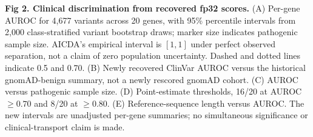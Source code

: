 \caption{{\bf Fig 2. Clinical discrimination from recovered fp32 scores.} (A) Per-gene AUROC for 4,677 variants across 20 genes, with 95\% percentile intervals from 2,000 class-stratified variant bootstrap draws; marker size indicates pathogenic sample size. AICDA's empirical interval is $[1,1]$ under perfect observed separation, not a claim of zero population uncertainty. Dashed and dotted lines indicate 0.5 and 0.70. (B) Newly recovered ClinVar AUROC versus the historical gnomAD-benign summary, not a newly rescored gnomAD cohort. (C) AUROC versus pathogenic sample size. (D) Point-estimate thresholds, 16/20 at AUROC $\geq0.70$ and 8/20 at $\geq0.80$. (E) Reference-sequence length versus AUROC. The new intervals are unadjusted per-gene summaries; no simultaneous significance or clinical-transport claim is made.}
